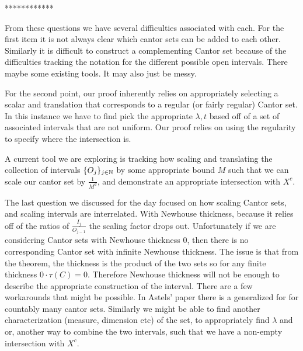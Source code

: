 ************

From these questions we have several difficulties associated with each.  For the first item it is not always clear which cantor sets can be added to each other.  Similarly it is difficult to construct a complementing Cantor set because of the difficulties tracking the notation for the different possible open intervals.  There maybe some existing tools. It may also just be messy. 

For the second point, our proof inherently relies on appropriately selecting a scalar and translation that corresponds to a regular (or fairly regular) Cantor set.  In this instance we have to find pick the appropriate $\lambda, t$ based off of a set of associated intervals that are not uniform.  Our proof relies on using the regularity to specify where the intersection is. 

A current tool we are exploring is tracking how scaling and translating the collection of intervals $\{O_j\}_{j \in \mathbb{N} }$ by some appropriate bound $M$ such that we can scale our cantor set by $\frac{1}{M^d}$, and demonstrate an appropriate intersection with $X^c$.  

        The last question we discussed for the day focused on how scaling Cantor sets, and scaling intervals are interrelated.  With Newhouse thickness, because it relies off of the ratios of $\frac{I_j}{O_{j-1}}$ the scaling factor drops out.  Unfortunately if we are considering Cantor sets with Newhouse thickness $0$, then there is no corresponding Cantor set with infinite Newhouse thickness.  The issue is that from the theorem, the thickness is the product of the two sets so for any finite thickness $0\cdot \tau(C) = 0$.  Therefore Newhouse thickness will not be enough to describe the appropriate construction of the interval.  There are a few workarounds that might be possible.  In Astels' paper\cite{Astels} there is a generalized for for countably many cantor sets. Similarly we might be able to find another characterization (measure, dimension etc) of the set, to appropriately find $\lambda$ and or, another way to combine the two intervals, such that we have a non-empty intersection with $X^c$.  

